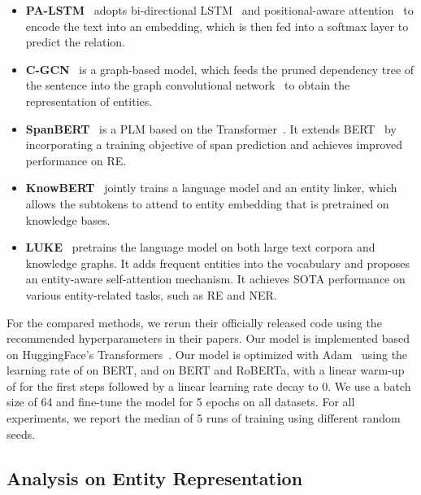 \documentclass[11pt,a4paper]{article}
\newcommand{\stitle}[1]{\vspace{0.3em}\noindent{\bf #1}}
\begin{document}
\begin{itemize}[leftmargin=1em]
    \setlength\itemsep{0em}
    \item \textbf{PA-LSTM}~\cite{zhang-etal-2017-position} adopts bi-directional LSTM~\cite{Hochreiter1997LongSM} and positional-aware attention~\cite{Bahdanau2015NeuralMT} to encode the text into an embedding, which is then fed into a softmax layer to predict the relation.
    \item \textbf{C-GCN}~\cite{zhang-etal-2018-graph} is a graph-based model, which feeds the pruned dependency tree of the sentence into the graph convolutional network~\cite{Kipf2017SemiSupervisedCW} to obtain the representation of entities.
    \item \textbf{SpanBERT}~\cite{joshi-etal-2020-spanbert} is a PLM based on the Transformer~\cite{vaswani2017attention}. It extends BERT~\cite{devlin-etal-2019-bert} by incorporating a training objective of span prediction and achieves improved performance on RE.
    \item \textbf{KnowBERT}~\cite{peters-etal-2019-knowledge} jointly trains a language model and an entity linker, which allows the subtokens to attend to entity embedding that is pretrained on knowledge bases.
    \item \textbf{LUKE}~\cite{yamada-etal-2020-luke} pretrains the language model on both large text corpora and knowledge graphs. It adds frequent entities into the vocabulary and proposes an entity-aware self-attention mechanism.
    It achieves SOTA performance on various entity-related tasks, such as RE and NER.
\end{itemize}
\fi

\stitle{Model configurations.}
For the compared methods, we rerun their officially released code using the recommended hyperparameters in their papers.
Our model is implemented based on HuggingFace's Transformers~\cite{wolf-etal-2020-transformers}.
Our model is optimized with Adam~\cite{Kingma2015AdamAM} using the learning rate of  on BERT, and  on BERT and RoBERTa, with a linear warm-up~\cite{Goyal2017AccurateLM} of for the first  steps followed by a linear learning rate decay to 0.
We use a batch size of 64 and fine-tune the model for 5 epochs on all datasets.
For all experiments, we report the median  of 5 runs of training using different random seeds.

\subsection{Analysis on Entity Representation}\label{ssec:exp_rep}
\end{document}
